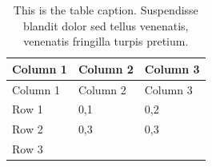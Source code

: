 \begin{longtable}[htbp]{@{}lll@{}}
\caption[This is a short table caption]{This is the table caption. Suspendisse blandit dolor sed tellus venenatis, venenatis fringilla turpis pretium. \label{ref_a_table}}\endlastfoot
\toprule
\begin{minipage}[b]{0.1388888888888889\columnwidth}\raggedright
Column 1\strut
\end{minipage} & \begin{minipage}[b]{0.16666666666666666\columnwidth}\raggedright
Column 2\strut
\end{minipage} & \begin{minipage}[b]{0.1388888888888889\columnwidth}\raggedright
Column 3\strut
\end{minipage}\tabularnewline
\midrule
\endfirsthead
\toprule
\begin{minipage}[b]{0.1388888888888889\columnwidth}\raggedright
Column 1\strut
\end{minipage} & \begin{minipage}[b]{0.16666666666666666\columnwidth}\raggedright
Column 2\strut
\end{minipage} & \begin{minipage}[b]{0.1388888888888889\columnwidth}\raggedright
Column 3\strut
\end{minipage}\tabularnewline
\midrule
\endhead
\begin{minipage}[t]{0.1388888888888889\columnwidth}\raggedright
Row 1\strut
\end{minipage} & \begin{minipage}[t]{0.16666666666666666\columnwidth}\raggedright
0,1\strut
\end{minipage} & \begin{minipage}[t]{0.1388888888888889\columnwidth}\raggedright
0,2\strut
\end{minipage}\tabularnewline\begin{minipage}[t]{0.1388888888888889\columnwidth}\raggedright
Row 2\strut
\end{minipage} & \begin{minipage}[t]{0.16666666666666666\columnwidth}\raggedright
0,3\strut
\end{minipage} & \begin{minipage}[t]{0.1388888888888889\columnwidth}\raggedright
0,3\strut
\end{minipage}\tabularnewline\begin{minipage}[t]{0.1388888888888889\columnwidth}\raggedright
Row 3\strut
\end{minipage} & \begin{minipage}[t]{0.16666666666666666\columnwidth}\raggedright

\end{minipage}
\end{longtable}
